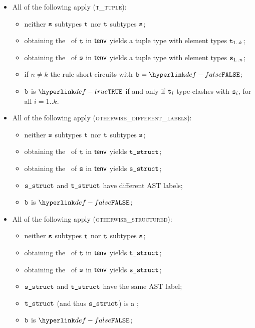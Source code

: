 \begin{itemize}
  \item All of the following apply (\textsc{t\_tuple}):
  \begin{itemize}
    \item neither $\texttt{s}$ subtypes $\texttt{t}$ nor $\texttt{t}$ subtypes $\texttt{s}$;
    \item obtaining the \structure\ of $\texttt{t}$ in $\textsf{tenv}$ yields a tuple type with element types $\texttt{t}_{1..k}$;
    \item obtaining the \structure\ of $\texttt{s}$ in $\textsf{tenv}$ yields a tuple type with element types $\texttt{s}_{1..n}$;
    \item if $n \neq k$ the rule short-circuits with $\vb=\False$;
    \item $\texttt{b}$ is $\True$ if and only if $\texttt{t}_i$ type-clashes with $\texttt{s}_i$, for all $i=1..k$.
  \end{itemize}

  \item All of the following apply (\textsc{otherwise\_different\_labels}):
  \begin{itemize}
    \item neither $\texttt{s}$ subtypes $\texttt{t}$ nor $\texttt{t}$ subtypes $\texttt{s}$;
    \item obtaining the \structure\ of $\texttt{t}$ in $\textsf{tenv}$ yields $\texttt{t\_struct}$;
    \item obtaining the \structure\ of $\texttt{s}$ in $\textsf{tenv}$ yields $\texttt{s\_struct}$;
    \item $\texttt{s\_struct}$ and $\texttt{t\_struct}$ have different AST labels;
    \item $\texttt{b}$ is $\False$;
  \end{itemize}

  \item All of the following apply (\textsc{otherwise\_structured}):
  \begin{itemize}
    \item neither $\texttt{s}$ subtypes $\texttt{t}$ nor $\texttt{t}$ subtypes $\texttt{s}$;
    \item obtaining the \structure\ of $\texttt{t}$ in $\textsf{tenv}$ yields $\texttt{t\_struct}$;
    \item obtaining the \structure\ of $\texttt{s}$ in $\textsf{tenv}$ yields $\texttt{s\_struct}$;
    \item $\texttt{s\_struct}$ and $\texttt{t\_struct}$ have the same AST label;
    \item $\texttt{t\_struct}$ (and thus $\texttt{s\_struct}$) is a \structuredtype;
    \item $\texttt{b}$ is $\False$;
  \end{itemize}
\end{itemize}

